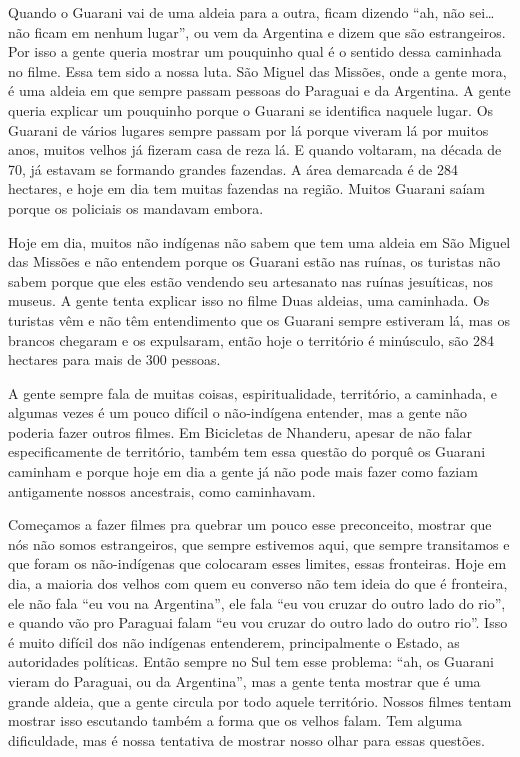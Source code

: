 Quando o Guarani vai de uma aldeia para a outra, ficam dizendo ``ah, não
sei\ldots{} não ficam em nenhum lugar'', ou vem da Argentina e dizem que são
estrangeiros. Por isso a gente queria mostrar um pouquinho qual é o
sentido dessa caminhada no filme. Essa tem sido a nossa luta. São
Miguel das Missões, onde a gente mora, é uma aldeia em que sempre
passam pessoas do Paraguai e da Argentina. A gente queria explicar um
pouquinho porque o Guarani se identifica naquele lugar. Os Guarani de
vários lugares sempre passam por lá porque viveram lá por muitos anos,
muitos velhos já fizeram casa de reza lá. E quando voltaram, na década
de 70, já estavam se formando grandes fazendas. A área demarcada é de
284 hectares, e hoje em dia tem muitas fazendas na região. Muitos
Guarani saíam porque os policiais os mandavam embora.

Hoje em dia, muitos não indígenas não sabem que tem uma aldeia em São
Miguel das Missões e não entendem porque os Guarani estão nas ruínas,
os turistas não sabem porque que eles estão vendendo seu artesanato nas
ruínas jesuíticas, nos museus. A gente tenta explicar isso no filme
Duas aldeias, uma caminhada. Os turistas vêm e não têm entendimento que
os Guarani sempre estiveram lá, mas os brancos chegaram e os
expulsaram, então hoje o território é minúsculo, são 284 hectares para
mais de 300 pessoas.

A gente sempre fala de muitas coisas, espiritualidade, território, a
caminhada, e algumas vezes é um pouco difícil o não-indígena entender,
mas a gente não poderia fazer outros filmes. Em Bicicletas de Nhanderu,
apesar de não falar especificamente de território, também tem essa
questão do porquê os Guarani caminham e porque hoje em dia a gente já
não pode mais fazer como faziam antigamente nossos ancestrais, como
caminhavam.

Começamos a fazer filmes pra quebrar um pouco esse preconceito, mostrar
que nós não somos estrangeiros, que sempre estivemos aqui, que sempre
transitamos e que foram os não-indígenas que colocaram esses limites,
essas fronteiras. Hoje em dia, a maioria dos velhos com quem eu
converso não tem ideia do que é fronteira, ele não fala ``eu vou na
Argentina'', ele fala ``eu vou cruzar do outro lado do rio'', e quando vão
pro Paraguai falam ``eu vou cruzar do outro lado do outro rio''. Isso é
muito difícil dos não indígenas entenderem, principalmente o Estado, as
autoridades políticas. Então sempre no Sul tem esse problema: ``ah, os
Guarani vieram do Paraguai, ou da Argentina'', mas a gente tenta mostrar
que é uma grande aldeia, que a gente circula por todo aquele
território. Nossos filmes tentam mostrar isso escutando também a forma
que os velhos falam. Tem alguma dificuldade, mas é nossa tentativa de
mostrar nosso olhar para essas questões.

